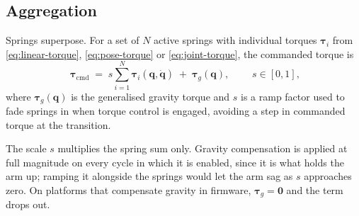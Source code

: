\subsection{Aggregation}
\label{sec:aggregation}

Springs superpose. For a set of $N$ active springs with individual torques
$\bm{\tau}_{i}$ from \eqref{eq:linear-torque}, \eqref{eq:pose-torque} or
\eqref{eq:joint-torque}, the commanded torque is
%
\begin{equation}
  \boxed{\;\bm{\tau}_{\mathrm{cmd}} \;=\;
  s\sum_{i=1}^{N}\bm{\tau}_{i}(\bm{q}, \dot{\bm{q}})
  \;+\; \bm{\tau}_{g}(\bm{q}),\;}
  \qquad s \in [0, 1],
  \label{eq:total-torque}
\end{equation}
%
where $\bm{\tau}_{g}(\bm{q})$ is the generalised gravity torque and $s$ is a
ramp factor used to fade springs in when torque control is engaged, avoiding a
step in commanded torque at the transition.

The scale $s$ multiplies the spring sum only. Gravity compensation is applied
at full magnitude on every cycle in which it is enabled, since it is what holds
the arm up; ramping it alongside the springs would let the arm sag as $s$
approaches zero. On platforms that compensate gravity in firmware,
$\bm{\tau}_{g} = \bm{0}$ and the term drops out.
